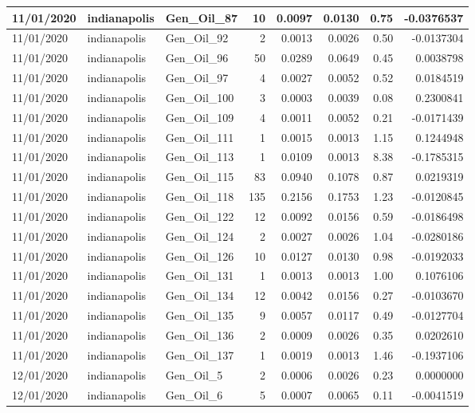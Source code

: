 \documentclass[
  letterpaper,
  DIV=11,
  numbers=noendperiod]{scrartcl}
\begin{document}
\begin{tabular}{l|l|l|r|r|r|r|r}
\hline
11/01/2020 & indianapolis & Gen\_Oil\_87 & 10 & 0.0097 & 0.0130 & 0.75 & -0.0376537\\
\hline
11/01/2020 & indianapolis & Gen\_Oil\_92 & 2 & 0.0013 & 0.0026 & 0.50 & -0.0137304\\
\hline
11/01/2020 & indianapolis & Gen\_Oil\_96 & 50 & 0.0289 & 0.0649 & 0.45 & 0.0038798\\
\hline
11/01/2020 & indianapolis & Gen\_Oil\_97 & 4 & 0.0027 & 0.0052 & 0.52 & 0.0184519\\
\hline
11/01/2020 & indianapolis & Gen\_Oil\_100 & 3 & 0.0003 & 0.0039 & 0.08 & 0.2300841\\
\hline
11/01/2020 & indianapolis & Gen\_Oil\_109 & 4 & 0.0011 & 0.0052 & 0.21 & -0.0171439\\
\hline
11/01/2020 & indianapolis & Gen\_Oil\_111 & 1 & 0.0015 & 0.0013 & 1.15 & 0.1244948\\
\hline
11/01/2020 & indianapolis & Gen\_Oil\_113 & 1 & 0.0109 & 0.0013 & 8.38 & -0.1785315\\
\hline
11/01/2020 & indianapolis & Gen\_Oil\_115 & 83 & 0.0940 & 0.1078 & 0.87 & 0.0219319\\
\hline
11/01/2020 & indianapolis & Gen\_Oil\_118 & 135 & 0.2156 & 0.1753 & 1.23 & -0.0120845\\
\hline
11/01/2020 & indianapolis & Gen\_Oil\_122 & 12 & 0.0092 & 0.0156 & 0.59 & -0.0186498\\
\hline
11/01/2020 & indianapolis & Gen\_Oil\_124 & 2 & 0.0027 & 0.0026 & 1.04 & -0.0280186\\
\hline
11/01/2020 & indianapolis & Gen\_Oil\_126 & 10 & 0.0127 & 0.0130 & 0.98 & -0.0192033\\
\hline
11/01/2020 & indianapolis & Gen\_Oil\_131 & 1 & 0.0013 & 0.0013 & 1.00 & 0.1076106\\
\hline
11/01/2020 & indianapolis & Gen\_Oil\_134 & 12 & 0.0042 & 0.0156 & 0.27 & -0.0103670\\
\hline
11/01/2020 & indianapolis & Gen\_Oil\_135 & 9 & 0.0057 & 0.0117 & 0.49 & -0.0127704\\
\hline
11/01/2020 & indianapolis & Gen\_Oil\_136 & 2 & 0.0009 & 0.0026 & 0.35 & 0.0202610\\
\hline
11/01/2020 & indianapolis & Gen\_Oil\_137 & 1 & 0.0019 & 0.0013 & 1.46 & -0.1937106\\
\hline
12/01/2020 & indianapolis & Gen\_Oil\_5 & 2 & 0.0006 & 0.0026 & 0.23 & 0.0000000\\
\hline
12/01/2020 & indianapolis & Gen\_Oil\_6 & 5 & 0.0007 & 0.0065 & 0.11 & -0.0041519\\

\end{tabular}
\end{document}

